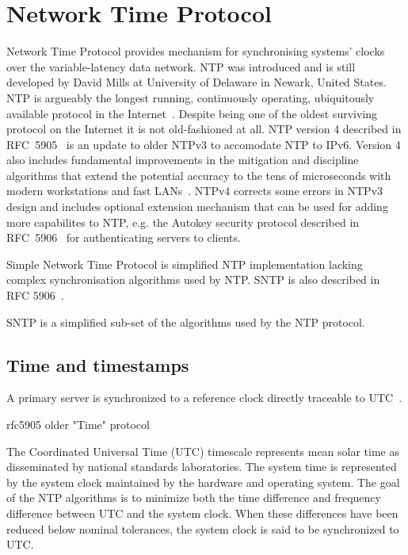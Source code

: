
\chapter{Network Time Protocol}
Network Time Protocol provides mechanism for synchronising systems' clocks over the variable-latency data network.
NTP was introduced and is still developed by David Mills at University of Delaware in Newark, United States.
NTP is argueably the longest running, continuously operating,
ubiquitously available protocol in the Internet~\cite{ntp-overview}.
Despite being one of the oldest surviving protocol on the Internet it is not old-fashioned at all.
NTP version 4 described in RFC~5905~\cite{rfc5905} is an update to older NTPv3 to accomodate NTP to IPv6.
Version 4 also includes fundamental improvements in
the mitigation and discipline algorithms that extend
the potential accuracy to the tens of microseconds with modern
workstations and fast LANs~\cite{rfc5905}.
NTPv4 corrects some
errors in NTPv3 design and includes optional extension mechanism
that can be used for adding more capabilites to NTP, e.g. the
Autokey security protocol described in RFC~5906~\cite{rfc5906}
for authenticating servers to clients.

Simple Network Time Protocol is simplified NTP implementation lacking complex
synchronisation algorithms used by NTP. SNTP is also described in RFC 5906~\cite{rfc5906}.

SNTP is a simplified sub-set of the algorithms used by the NTP protocol.


\section{Time and timestamps}

A primary server is synchronized to a reference clock directly traceable
to UTC~\cite{rfc5905}.

\! 
\! rfc5905
\! older "Time" protocol


The Coordinated Universal Time (UTC) timescale represents mean solar
   time as disseminated by national standards laboratories.  The system
   time is represented by the system clock maintained by the hardware
   and operating system.  The goal of the NTP algorithms is to minimize
   both the time difference and frequency difference between UTC and the
   system clock.  When these differences have been reduced below nominal
   tolerances, the system clock is said to be synchronized to UTC.



